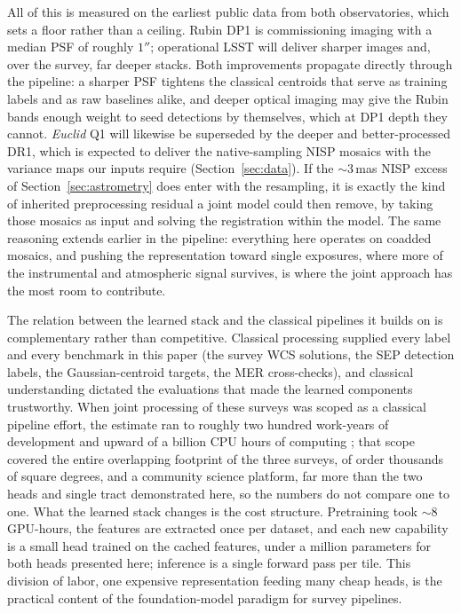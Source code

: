 \documentclass[twocolumn,linenumbers]{aastex701}
\begin{document}
All of this is measured on the earliest public data from both observatories, which sets a floor rather than a ceiling. Rubin DP1 is commissioning imaging with a median PSF of roughly $1''$; operational LSST will deliver sharper images and, over the survey, far deeper stacks. Both improvements propagate directly through the pipeline: a sharper PSF tightens the classical centroids that serve as training labels and as raw baselines alike, and deeper optical imaging may give the Rubin bands enough weight to seed detections by themselves, which at DP1 depth they cannot. \textit{Euclid} Q1 will likewise be superseded by the deeper and better-processed DR1, which is expected to deliver the native-sampling NISP mosaics with the variance maps our inputs require (Section~\ref{sec:data}). If the ${\sim}3$\,mas NISP excess of Section~\ref{sec:astrometry} does enter with the resampling, it is exactly the kind of inherited preprocessing residual a joint model could then remove, by taking those mosaics as input and solving the registration within the model. The same reasoning extends earlier in the pipeline: everything here operates on coadded mosaics, and pushing the representation toward single exposures, where more of the instrumental and atmospheric signal survives, is where the joint approach has the most room to contribute.

The relation between the learned stack and the classical pipelines it builds on is complementary rather than competitive. Classical processing supplied every label and every benchmark in this paper (the survey WCS solutions, the \textsc{SEP} detection labels, the Gaussian-centroid targets, the MER cross-checks), and classical understanding dictated the evaluations that made the learned components trustworthy. When joint processing of these surveys was scoped as a classical pipeline effort, the estimate ran to roughly two hundred work-years of development and upward of a billion CPU hours of computing \citep{Chary2020}; that scope covered the entire overlapping footprint of the three surveys, of order thousands of square degrees, and a community science platform, far more than the two heads and single tract demonstrated here, so the numbers do not compare one to one. What the learned stack changes is the cost structure. Pretraining took ${\sim}8$ GPU-hours, the features are extracted once per dataset, and each new capability is a small head trained on the cached features, under a million parameters for both heads presented here; inference is a single forward pass per tile. This division of labor, one expensive representation feeding many cheap heads, is the practical content of the foundation-model paradigm for survey pipelines.
\end{document}
